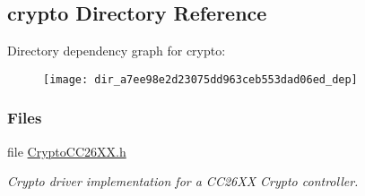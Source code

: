 \subsection{crypto Directory Reference}
\label{dir_a7ee98e2d23075dd963ceb553dad06ed}
Directory dependency graph for crypto\+:
\nopagebreak
\begin{figure}[H]
\begin{center}
\leavevmode
\texttt{[image: dir\_a7ee98e2d23075dd963ceb553dad06ed\_dep]}
\end{center}
\end{figure}
\subsubsection*{Files}
\begin{DoxyCompactItemize}
\item 
file \hyperlink{_crypto_c_c26_x_x_8h}{Crypto\+C\+C26\+X\+X.\+h}
\begin{DoxyCompactList}\small\item\em Crypto driver implementation for a C\+C26\+X\+X Crypto controller. \end{DoxyCompactList}\end{DoxyCompactItemize}
